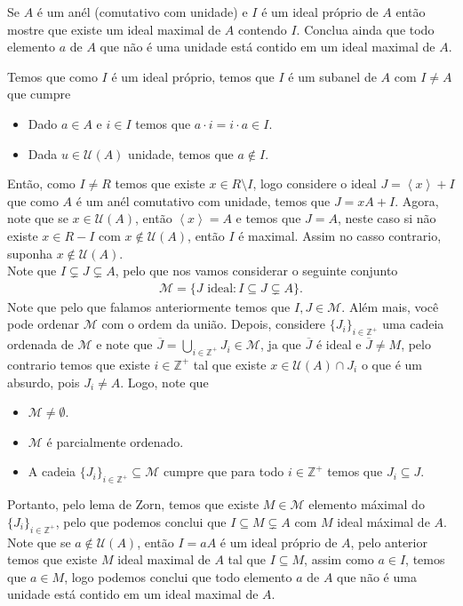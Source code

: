 \begin{homeworkProblem}[4]
  Se $A$ é um anél (comutativo com unidade) e $I$ é um ideal próprio de $A$ então mostre que existe um ideal maximal de $A$ contendo $I$. Conclua ainda que todo elemento $a$ de $A$ que não é uma unidade está contido em um ideal maximal de $A$. 
  \begin{solution}
    Temos que como $I$ é um ideal próprio, temos que $I$ é um subanel de $A$ com $I\neq A$ que cumpre
    \begin{itemize}
      \item Dado $a\in A$ e $i\in I$ temos que $a\cdot i=i\cdot a\in I$.
      \item Dada $u\in \mathcal{U}(A)$ unidade, temos que $a\notin I$. 
    \end{itemize}
    Então, como $I\neq R$ temos que existe $x\in R\setminus I$, logo considere o ideal $J=\left\langle x \right\rangle+I$ que como $A$ é um anél comutativo com unidade, temos que $J=xA+I$. Agora, note que se $x\in\mathcal{U}(A)$, então $\left\langle x \right\rangle=A$ e temos que $J=A$, neste caso si não existe $x\in R-I$ com $x\notin\mathcal{U}(A)$, então $I$ é maximal. Assim no casso contrario, suponha $x\notin\mathcal{U}(A)$.\\
    Note que $I\subsetneq J\subsetneq A$, pelo que nos vamos considerar o seguinte conjunto
    \begin{align*}
      \mathcal{M}=\{J\text{ ideal}:I\subseteq J\subsetneq A\}.
    \end{align*}
    Note que pelo que falamos anteriormente temos que $I,J\in \mathcal{M}$. Além mais, você pode ordenar $\mathcal{M}$ com o ordem da união. Depois, considere $\{J_i\}_{i\in\mathbb{Z}^{+}}$ uma cadeia ordenada de $\mathcal{M}$ e note que $\overline{J}=\bigcup_{i\in\mathbb{Z}^{+}}J_{i}\in \mathcal{M}$, ja que $\overline{J}$ é ideal e $\overline{J}\neq M$, pelo contrario temos que existe $i\in\mathbb{Z}^{+}$ tal que existe $x\in\mathcal{U}(A)\cap J_i$ o que é um absurdo, pois $J_i\neq A$. Logo, note que
    \begin{itemize}
      \item $\mathcal{M}\neq\emptyset$.
      \item $\mathcal{M}$ é parcialmente ordenado.
      \item A cadeia $\{J_i\}_{i\in\mathbb{Z}^{+}}\subseteq\mathcal{M}$ cumpre que para todo $i\in\mathbb{Z}^{+}$ temos que $J_i\subseteq J$. 
    \end{itemize}
    Portanto, pelo lema de Zorn, temos que existe $M\in\mathcal{M}$ elemento máximal do $\{J_i\}_{i\in\mathbb{Z}^{+}}$, pelo que podemos conclui que $I\subseteq M\subsetneq A$ com $M$ ideal máximal de $A$.\\

    Note que se $a\notin\mathcal{U}(A)$, então $I=aA$ é um ideal próprio de $A$, pelo anterior temos que existe $M$ ideal maximal de $A$ tal que $I\subseteq M$, assim como $a\in I$, temos que $a\in M$, logo podemos conclui que todo elemento $a$ de $A$ que não é uma unidade está contido em um ideal maximal de $A$. 
  \end{solution}
\end{homeworkProblem}
